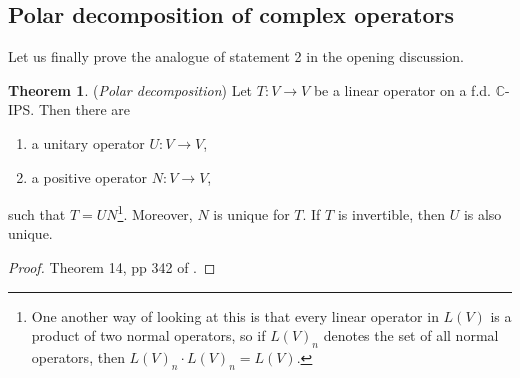 \documentclass[letterpaper,11pt,twoside]{article}
\theoremstyle{definition}
\theoremstyle{definition}
\newtheorem{theorem}[proposition]{Theorem}
\theoremstyle{definition}
\theoremstyle{definition}
\theoremstyle{definition}
\theoremstyle{definition}
\theoremstyle{remark}
\theoremstyle{definition}
\newcommand{\C}{\mathbb{C}}
\begin{document}
	\subsection{Polar decomposition of complex operators}
    Let us finally prove the analogue of statement 2 in the opening discussion. 
    \begin{theorem}\label{T-7.2.1}
    	(\textit{Polar decomposition}) Let $ T : V\to V $ be a linear operator on a f.d. $ \C $-IPS. Then there are
    	\begin{enumerate}
    			\item {a unitary operator $ U : V\to V $,}
    		\item {a positive operator $ N : V\to V $,}
    	\end{enumerate}
    	such that $ T=UN $\footnote{One another way of looking at this is that every linear operator in $ L(V) $ is a product of two normal operators, so if $ L(V)_n $ denotes the set of all normal operators, then $ L(V)_n \cdot L(V)_n = L(V) $.}. Moreover, $ N $ is unique for $ T $. If $ T $ is invertible, then $ U $ is also unique.
    \end{theorem}
	\begin{proof}
		Theorem 14, pp 342 of \cite{HK71}.
	\end{proof}
\end{document}
